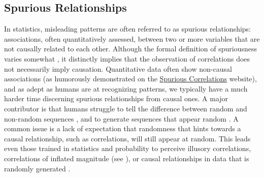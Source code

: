 \documentclass{article}
\theoremstyle{plain}
\theoremstyle{definition}
\theoremstyle{remark}
\begin{document}
\subsection{Spurious Relationships}
In statistics, misleading patterns are often referred to as spurious relationships: associations, often quantitatively assessed, between two or more variables that are not causally related to each other. Although the formal definition of spuriousness varies somewhat \cite{haig2003spurious}, it distinctly implies that the observation of correlations does not necessarily imply causation. Quantitative data often show non-causal associations (as humorously demonstrated on the \href{http://www.tylervigen.com/spurious-correlations}{Spurious Correlations} website), and as adept as humans are at recognizing patterns, we typically have a much harder time discerning spurious relationships from causal ones. A major contributor is that humans struggle to tell the difference between random and non-random sequences \cite{falk1997making}, and to generate sequences that appear random \cite{ladouceur1996erroneous}. A common issue is a lack of expectation that randomness that hints towards a causal relationship, such as correlations, will still appear at random. This leads even those trained in statistics and probability to perceive illusory correlations, correlations of inflated magnitude (see \citet{nickerson1998confirmation}), or causal relationships in data that is randomly generated \cite{zgraggen2018investigating}.


 



\end{document}
